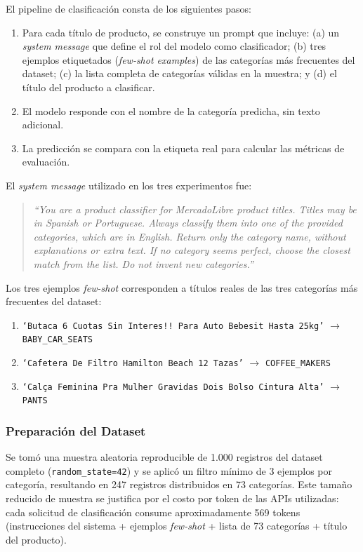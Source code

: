 \documentclass[11pt,a4paper]{article}
\begin{document}
El pipeline de clasificación consta de los siguientes pasos:
\begin{enumerate}
    \item Para cada título de producto, se construye un prompt que incluye: (a) un \emph{system message} que define el rol del modelo como clasificador; (b) tres ejemplos etiquetados (\emph{few-shot examples}) de las categorías más frecuentes del dataset; (c) la lista completa de categorías válidas en la muestra; y (d) el título del producto a clasificar.
    \item El modelo responde con el nombre de la categoría predicha, sin texto adicional.
    \item La predicción se compara con la etiqueta real para calcular las métricas de evaluación.
\end{enumerate}

El \emph{system message} utilizado en los tres experimentos fue:

\begin{quote}
\textit{``You are a product classifier for MercadoLibre product titles. Titles may be in Spanish or Portuguese. Always classify them into one of the provided categories, which are in English. Return only the category name, without explanations or extra text. If no category seems perfect, choose the closest match from the list. Do not invent new categories.''}
\end{quote}

Los tres ejemplos \emph{few-shot} corresponden a títulos reales de las tres categorías más frecuentes del dataset:

\begin{enumerate}
    \item \texttt{`Butaca 6 Cuotas Sin Interes!! Para Auto Bebesit Hasta 25kg'} $\to$ \texttt{BABY\_CAR\_SEATS}
    \item \texttt{`Cafetera De Filtro Hamilton Beach 12 Tazas'} $\to$ \texttt{COFFEE\_MAKERS}
    \item \texttt{`Calça Feminina Pra Mulher Gravidas Dois Bolso Cintura Alta'} $\to$ \texttt{PANTS}
\end{enumerate}

\subsubsection{Preparación del Dataset}

Se tomó una muestra aleatoria reproducible de 1.000 registros del dataset completo (\texttt{random\_state=42}) y se aplicó un filtro mínimo de 3 ejemplos por categoría, resultando en 247 registros distribuidos en 73 categorías. Este tamaño reducido de muestra se justifica por el costo por token de las APIs utilizadas: cada solicitud de clasificación consume aproximadamente 569 tokens (instrucciones del sistema + ejemplos \emph{few-shot} + lista de 73 categorías + título del producto).
\end{document}
